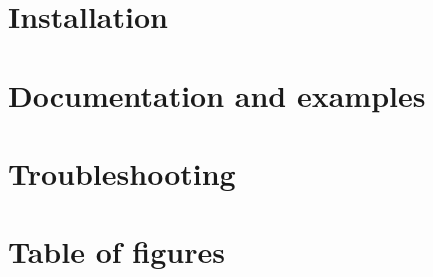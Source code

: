 \documentclass[a4paper, 11pt]{article}
\newcommand{\emptypage}{\newpage \thispagestyle{empty} \mbox{}\newpage}
\begin{document}
\pagebreak
\section{Installation}


\pagebreak
\section{Documentation and examples}


\pagebreak
\section{Troubleshooting}


\pagebreak
\section{Table of figures}
\listoffigures{}


\pagebreak
\end{document}
